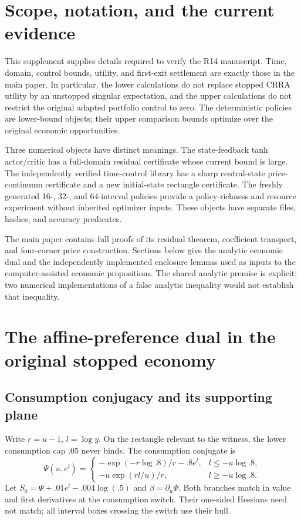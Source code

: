 \section{Scope, notation, and the current evidence}
This supplement supplies details required to verify the R14 manuscript. Time, domain, control bounds, utility, and first-exit settlement are exactly those in the main paper. In particular, the lower calculations do not replace stopped CRRA utility by an unstopped singular expectation, and the upper calculations do not restrict the original adapted portfolio control to zero. The deterministic policies are lower-bound objects; their upper comparison bounds optimize over the original economic opportunities.

Three numerical objects have distinct meanings. The state-feedback tanh actor/critic has a full-domain residual certificate whose current bound is large. The independently verified time-control library has a sharp central-state price-continuum certificate and a new initial-state rectangle certificate. The freshly generated 16-, 32-, and 64-interval policies provide a policy-richness and resource experiment without inherited optimizer inputs. These objects have separate files, hashes, and accuracy predicates.

The main paper contains full proofs of its residual theorem, coefficient transport, and four-corner price construction. Sections below give the analytic economic dual and the independently implemented enclosure lemmas used as inputs to the computer-assisted economic propositions. The shared analytic premise is explicit: two numerical implementations of a false analytic inequality would not establish that inequality.

\section{The affine-preference dual in the original stopped economy}\label{supp:dual}
\subsection{Consumption conjugacy and its supporting plane}
Write $r=u-1$, $l=\log y$. On the rectangle relevant to the witness, the lower consumption cap $.05$ never binds. The consumption conjugate is
\begin{equation}
 \Psi(u,e^l)=
 \begin{cases}
 -\exp(-r\log .8)/r-.8e^l,& l\leq-u\log .8,\\
 -u\exp(rl/u)/r,&l\geq-u\log .8.
 \end{cases}\label{supp:Psi}
\end{equation}
Let $S_0=\Psi+.01e^l-.004\log(.5)$ and $\beta=\partial_u\Psi$. Both branches match in value and first derivatives at the consumption switch. Their one-sided Hessians need not match; all interval boxes crossing the switch use their hull.


